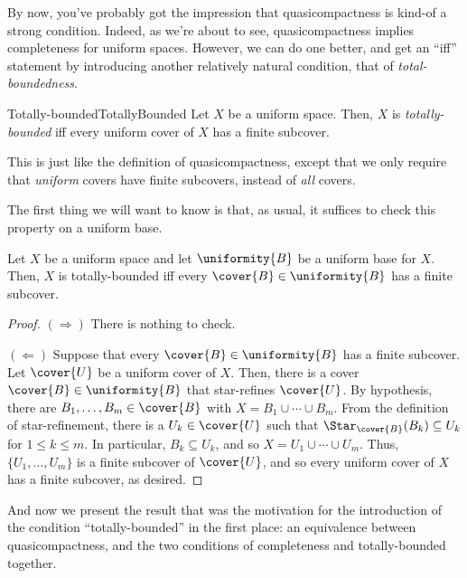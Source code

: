By now, you've probably got the impression that quasicompactness is kind-of a strong condition.  Indeed, as we're about to see, quasicompactness implies completeness for uniform spaces.  However, we can do one better, and get an ``iff'' statement by introducing another relatively natural condition, that of \emph{total-boundedness}.
\begin{dfn}{Totally-bounded}{TotallyBounded}
Let $X$ be a uniform space.  Then, $X$ is \emph{totally-bounded} iff every uniform cover of $X$ has a finite subcover.
\begin{rmk}
This is just like the definition of quasicompactness, except that we only require that \emph{uniform} covers have finite subcovers, instead of \emph{all} covers.
\end{rmk}
\end{dfn}
The first thing we will want to know is that, as usual, it suffices to check this property on a uniform base.
\begin{prp}{}{}
Let $X$ be a uniform space and let $\uniformity{B}$ be a uniform base for $X$.  Then, $X$ is totally-bounded iff every $\cover{B}\in \uniformity{B}$ has a finite subcover.
\begin{proof}
$(\Rightarrow )$ There is nothing to check.

\blankline
\noindent
$(\Leftarrow )$ Suppose that every $\cover{B}\in \uniformity{B}$ has a finite subcover.  Let $\cover{U}$ be a uniform cover of $X$.  Then, there is a cover $\cover{B}\in \uniformity{B}$ that star-refines $\cover{U}$.  By hypothesis, there are $B_1,\ldots ,B_m\in \cover{B}$ with $X=B_1\cup \cdots \cup B_m$.  From the definition of star-refinement, there is a $U_k\in \cover{U}$ such that $\Star _{\cover{B}}(B_k)\subseteq U_k$ for $1\leq k\leq m$.  In particular, $B_k\subseteq U_k$, and so $X=U_1\cup \cdots \cup U_m$.  Thus, $\{ U_1,\ldots ,U_m\}$ is a finite subcover of $\cover{U}$, and so every uniform cover of $X$ has a finite subcover, as desired.
\end{proof}
\end{prp}
And now we present the result that was the motivation for the introduction of the condition ``totally-bounded'' in the first place:  an equivalence between quasicompactness, and the two conditions of completeness and totally-bounded together.

